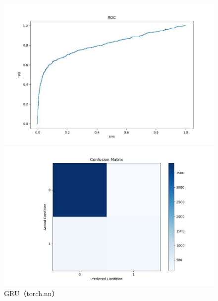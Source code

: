 \documentclass[UTF8]{article}
\begin{document}
\begin{figure}[h]
    \begin{minipage}{.48\linewidth}
        \centering
        \includegraphics[width=\linewidth]{../figure/GRU_ROC.jpg}
    \end{minipage}
    \begin{minipage}{.48\linewidth}
        \centering
        \includegraphics[width=\linewidth]{../figure/GRU_Confusion.jpg}
    \end{minipage}
    \caption{GRU（torch.nn）}
\end{figure}
\end{document}
